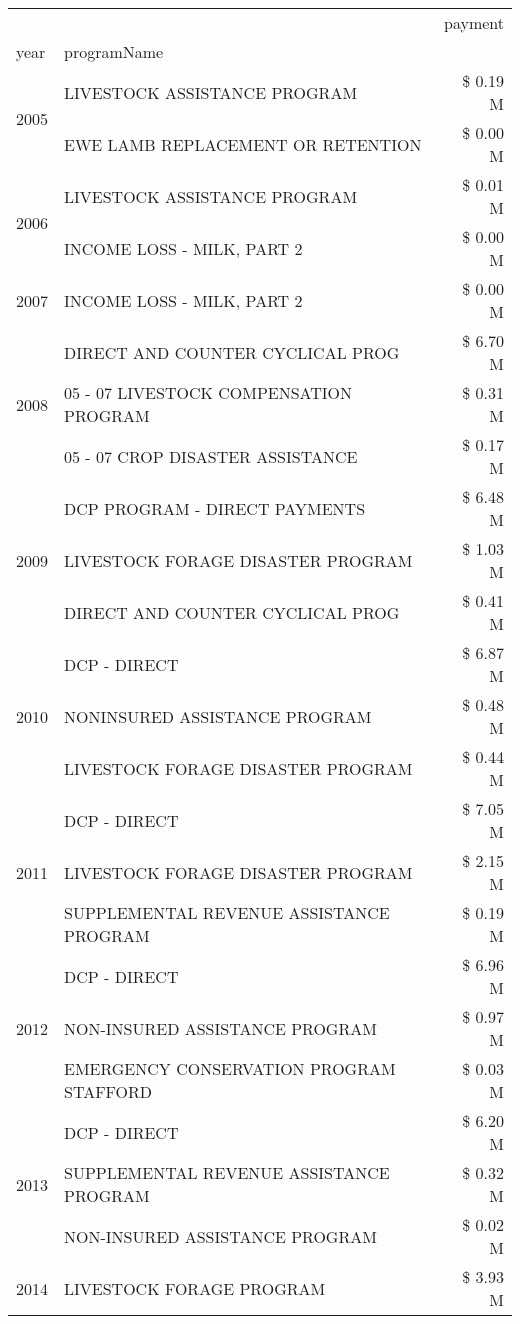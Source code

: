 \begin{tabular}{llr}
\toprule
 &  & payment \\
year & programName &  \\
\midrule
\multirow[t]{2}{*}{2005} & LIVESTOCK ASSISTANCE PROGRAM & \$ 0.19 M \\
 & EWE LAMB REPLACEMENT OR RETENTION & \$ 0.00 M \\
\cline{1-3}
\multirow[t]{2}{*}{2006} & LIVESTOCK ASSISTANCE PROGRAM & \$ 0.01 M \\
 & INCOME LOSS - MILK, PART 2 & \$ 0.00 M \\
\cline{1-3}
2007 & INCOME LOSS - MILK, PART 2 & \$ 0.00 M \\
\cline{1-3}
\multirow[t]{3}{*}{2008} & DIRECT AND COUNTER CYCLICAL PROG & \$ 6.70 M \\
 & 05 - 07 LIVESTOCK COMPENSATION PROGRAM & \$ 0.31 M \\
 & 05 - 07 CROP DISASTER ASSISTANCE & \$ 0.17 M \\
\cline{1-3}
\multirow[t]{3}{*}{2009} & DCP PROGRAM - DIRECT PAYMENTS & \$ 6.48 M \\
 & LIVESTOCK FORAGE DISASTER  PROGRAM & \$ 1.03 M \\
 & DIRECT AND COUNTER CYCLICAL PROG & \$ 0.41 M \\
\cline{1-3}
\multirow[t]{3}{*}{2010} & DCP - DIRECT & \$ 6.87 M \\
 & NONINSURED ASSISTANCE PROGRAM & \$ 0.48 M \\
 & LIVESTOCK FORAGE DISASTER PROGRAM & \$ 0.44 M \\
\cline{1-3}
\multirow[t]{3}{*}{2011} & DCP - DIRECT & \$ 7.05 M \\
 & LIVESTOCK FORAGE DISASTER PROGRAM & \$ 2.15 M \\
 & SUPPLEMENTAL REVENUE ASSISTANCE PROGRAM & \$ 0.19 M \\
\cline{1-3}
\multirow[t]{3}{*}{2012} & DCP - DIRECT & \$ 6.96 M \\
 & NON-INSURED ASSISTANCE PROGRAM & \$ 0.97 M \\
 & EMERGENCY CONSERVATION PROGRAM STAFFORD & \$ 0.03 M \\
\cline{1-3}
\multirow[t]{3}{*}{2013} & DCP - DIRECT & \$ 6.20 M \\
 & SUPPLEMENTAL REVENUE ASSISTANCE PROGRAM & \$ 0.32 M \\
 & NON-INSURED ASSISTANCE PROGRAM & \$ 0.02 M \\
\cline{1-3}
\multirow[t]{3}{*}{2014} & LIVESTOCK FORAGE PROGRAM & \$ 3.93 M \\

\end{tabular}
